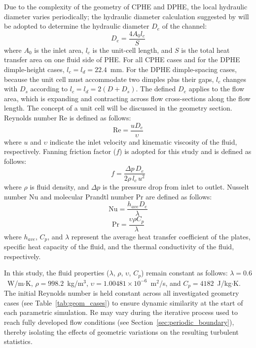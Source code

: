 \documentclass[review,12pt]{elsarticle}
\begin{document}
Due to the complexity of the geometry of CPHE and DPHE, the local hydraulic diameter varies periodically; the hydraulic diameter calculation suggested by \citet{jiang2019a, zohuri2017} will be adopted to determine the hydraulic diameter $D_e$ of the channel:
\begin{equation}
D_e=\frac{4A_0 l_c}{S}
\label{eq:De}
\end{equation}
where $A_0$ is the inlet area, $l_c$ is the unit-cell length, and $S$ is the total heat transfer area on one fluid side of PHE. For all CPHE cases and for the DPHE dimple-height cases, $l_c = l_d = 22.4$~mm. For the DPHE dimple-spacing cases, because the unit cell must accommodate two dimples plus their gaps, $l_c$ changes with $D_s$ according to $l_c = l_d = 2(D + D_s)$. The defined $D_e$ applies to the flow area, which is expanding and contracting across flow cross-sections along the flow length. The concept of a unit cell will be discussed in the geometry section. Reynolds number Re is defined as follows:
\begin{equation}
\text{Re}=\frac{uD_e}{\upsilon}
\label{eq:Re}
\end{equation}
where $u$ and $\upsilon$ indicate the inlet velocity and kinematic viscosity of the fluid, respectively. Fanning friction factor ($f$) is adopted for this study and is defined as follows:
\begin{equation}
f=\frac{\Delta p \, D_e}{2\rho \, l_c \, u^2}
\label{eq:f}
\end{equation}
where $\rho$ is fluid density, and $\Delta p$ is the pressure drop from inlet to outlet. Nusselt number Nu and molecular Prandtl number Pr are defined as follows:
\begin{equation}
\text{Nu}=\frac{h_{ave} D_e}{\lambda} 
\label{eq:Nu}
\end{equation}
\begin{equation}
\text{Pr}=\frac{\upsilon\rho C_p}{\lambda}
\label{eq:Pr}
\end{equation}
where $h_{ave}$, $C_p$, and $\lambda$ represent the average heat transfer coefficient of the plates, specific heat capacity of the fluid, and the thermal conductivity of the fluid, respectively.

In this study, the fluid properties ($\lambda$, $\rho$, $\upsilon$, $C_p$) remain constant as follows: $\lambda = 0.6$~W/m$\cdot$K, $\rho = 998.2$~kg/m$^3$, $\upsilon = 1.00481 \times 10^{-6}$~m$^2$/s, and $C_p = 4182$~J/kg$\cdot$K. The initial Reynolds number is held constant across all investigated geometry cases (see Table~\ref{tab:geom_cases}) to ensure dynamic similarity at the start of each parametric simulation. Re may vary during the iterative process used to reach fully developed flow conditions (see Section~\ref{sec:periodic_boundary}), thereby isolating the effects of geometric variations on the resulting turbulent statistics.
\end{document}
